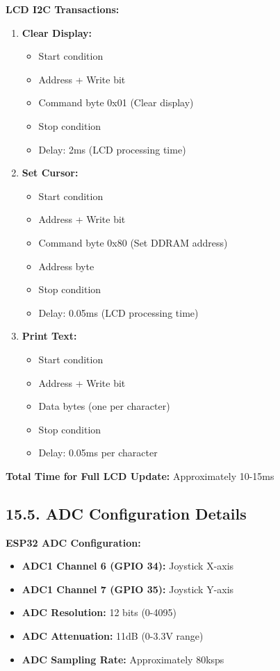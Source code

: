 \documentclass[12pt]{article}
\begin{document}
\textbf{LCD I2C Transactions:}

\begin{enumerate}
    \item \textbf{Clear Display:} 
    \begin{itemize}
        \item Start condition
        \item Address + Write bit
        \item Command byte 0x01 (Clear display)
        \item Stop condition
        \item Delay: 2ms (LCD processing time)
    \end{itemize}
    
    \item \textbf{Set Cursor:}
    \begin{itemize}
        \item Start condition
        \item Address + Write bit
        \item Command byte 0x80 (Set DDRAM address)
        \item Address byte
        \item Stop condition
        \item Delay: 0.05ms (LCD processing time)
    \end{itemize}
    
    \item \textbf{Print Text:}
    \begin{itemize}
        \item Start condition
        \item Address + Write bit
        \item Data bytes (one per character)
        \item Stop condition
        \item Delay: 0.05ms per character
    \end{itemize}
\end{enumerate}

\textbf{Total Time for Full LCD Update:} Approximately 10-15ms

\subsection*{15.5. ADC Configuration Details}

\textbf{ESP32 ADC Configuration:}
\begin{itemize}
    \item \textbf{ADC1 Channel 6 (GPIO 34):} Joystick X-axis
    \item \textbf{ADC1 Channel 7 (GPIO 35):} Joystick Y-axis
    \item \textbf{ADC Resolution:} 12 bits (0-4095)
    \item \textbf{ADC Attenuation:} 11dB (0-3.3V range)
    \item \textbf{ADC Sampling Rate:} Approximately 80ksps
\end{itemize}
\end{document}
